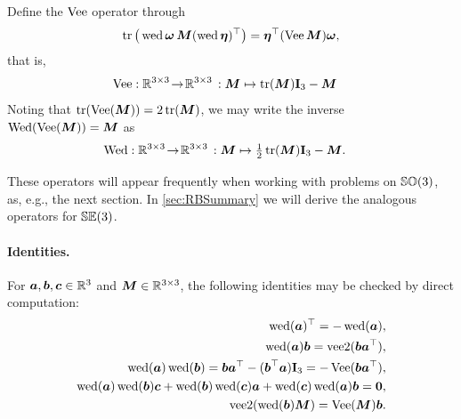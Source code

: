 Define the $\veeMatOp$ operator through
\begin{align}\label{eq:EqVeeMatOpSO3}
 \tr\big( \wedOp\tuple{\omega}\, \mat{M} (\wedOp\tuple{\eta})^\top \big) = \tuple{\eta}^\top (\veeMatOp\mat{M}) \tuple{\omega},
\end{align}
that is,
\begin{align}
 \veeMatOp &: \RealNum^{3\times 3} \!\rightarrow\! \RealNum^{3\times3} \, : \mat{M} \mapsto \tr(\mat{M}) \idMat[3] - \mat{M}
\end{align} 
Noting that $\tr(\veeMatOp(\mat{M})) = 2\tr(\mat{M})$, we may write the inverse $\wedMatOp(\veeMatOp(\mat{M})) = \mat{M}$ as
\begin{align}
 \wedMatOp &: \RealNum^{3\times 3} \!\rightarrow\! \RealNum^{3\times3} \, : \mat{M} \mapsto \tfrac{1}{2}\tr(\mat{M}) \idMat[3] - \mat{M}.
\end{align}

These operators will appear frequently when working with problems on $\SpecialOrthogonalGroup(3)$, as, e.g., the next section.
In \autoref{sec:RBSummary} we will derive the analogous operators for $\SpecialEuclideanGroup(3)$.

\paragraph{Identities.}
For $\tuple{a}, \tuple{b}, \tuple{c} \in \RealNum^{3}$ and $\mat{M}\in\RealNum^{3\times3}$, the following identities may be checked by direct computation:
\begin{subequations}\label{eq:identitiesWedgeSO3}
\begin{align}
 \wedOp(\tuple{a})^\top = -\wedOp(\tuple{a}),
\\
 \wedOp(\tuple{a}) \tuple{b} = \veeTwoOp(\tuple{b} \tuple{a}^\top),
\\
 \wedOp(\tuple{a}) \wedOp(\tuple{b}) = \tuple{b} \tuple{a}^\top - (\tuple{b}^\top \tuple{a}) \idMat[3] = -\veeMatOp(\tuple{b} \tuple{a}^\top),
\\
 \wedOp(\tuple{a}) \wedOp(\tuple{b}) \tuple{c} + \wedOp(\tuple{b}) \wedOp(\tuple{c}) \tuple{a} + \wedOp(\tuple{c}) \wedOp(\tuple{a}) \tuple{b} = \tuple{0},
 \label{eq:JacobiIdentitiySO3}
\\
 \veeTwoOp(\wedOp(\tuple{b}) \mat{M}) = \veeMatOp(\mat{M}) \tuple{b}.
\end{align} 
\end{subequations}

